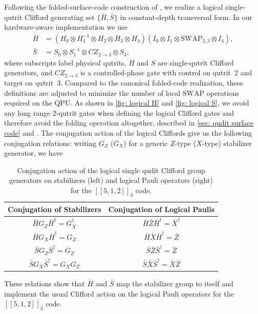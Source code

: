Following the folded-surface-code construction of
\cite{Moussa2016}, we realize a logical single-qutrit Clifford generating set $\{\bar H,\bar S\}$ in constant-depth transversal form. In our hardware-aware
implementation we use
\begin{align}
  \bar H &=
  (H_0 \otimes H_1^{-1} \otimes H_2 \otimes H_3 \otimes H_4)
  (I_0 \otimes I_1 \otimes \mathrm{SWAP}_{2,3} \otimes I_4), \\
  \bar S &= S_0 \otimes S_1^{-1} \otimes CZ_{2\rightarrow 3} \otimes S_4,
  \label{eq:logical_HS}
\end{align}
where subscripts label physical qutrits, $H$ and $S$ are single-qutrit Clifford generators, and $CZ_{2\rightarrow 3}$ is a controlled-phase gate with control on qutrit~2 and target on qutrit~3. Compared to the canonical folded-code realization, these definitions are adjusted to minimize the number of local $\mathrm{SWAP}$ operations required on the QPU. As shown in \autoref{fig: logical H} and \autoref{fig: logical S}, we avoid any long range 2-qutrit gates when defining the logical Clifford gates and therefore avoid the folding operation altogether, described in \autoref{sec: qudit surface code} and \cite{Moussa2016}. The conjugation action of the logical Cliffords give us the following conjugation relations: writing $G_Z$ ($G_X$) for a generic $Z$-type ($X$-type) stabilizer generator, we have
\begin{table}[H]
  \centering
  \begin{tabular}{c|c}
    \hline
    Conjugation of Stabilizers
      & Conjugation of Logical Paulis\\
    \hline
    $\bar H G_Z \bar H^\dagger = G_X^\dagger$
      & $\bar H \bar Z \bar H^\dagger = \bar X^\dagger$ \\
    $\bar H G_X \bar H^\dagger = G_Z$
      & $\bar H \bar X \bar H^\dagger = \bar Z$ \\
    $\bar S G_Z \bar S^\dagger = G_Z$
      & $\bar S \bar Z \bar S^\dagger = \bar Z$ \\
    $\bar S G_X \bar S^\dagger = G_X G_Z$
      & $\bar S \bar X \bar S^\dagger = \bar X \bar Z$ \\
    \hline
  \end{tabular}
  \caption{Conjugation action of the logical single qudit Clifford group generators on
  stabilizers (left) and logical Pauli operators (right) for the  $[[5,1,2]]_3$ code.}
  \label{tab:clifford-conjugation}
\end{table}
These relations show that $\bar H$ and $\bar S$ map the stabilizer group to itself and implement the usual Clifford action on the logical Pauli operators for the $[[5,1,2]]_3$ code.

